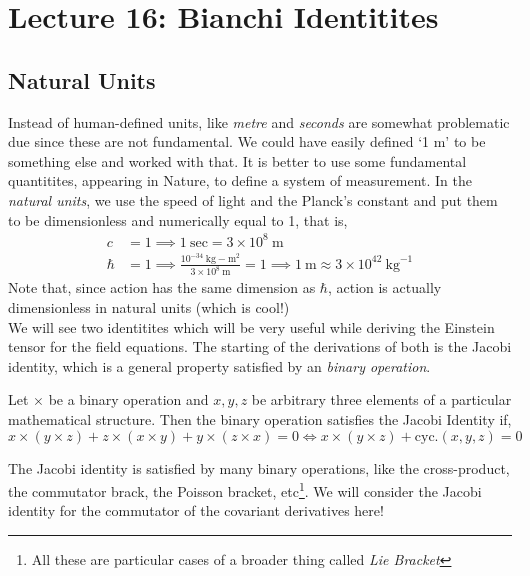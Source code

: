 \section*{Lecture 16: Bianchi Identitites}
\subsection{Natural Units}
Instead of human-defined units, like \textit{metre} and \textit{seconds} are somewhat problematic due since these are not fundamental. We could have easily defined `1 m' to be something else and worked with that. It is better to use some fundamental quantitites, appearing in Nature, to define a system of measurement. In the \textit{natural units}, we use the speed of light and the Planck's constant and put them to be dimensionless and numerically equal to 1, that is,
\begin{align*}
    c &= 1 \implies 1 \ \mathrm{sec} = 3\times 10^8\ \mathrm{m}\\
    \hbar&=1 \implies \frac{10^{-34} \ \mathrm{kg-m}^2 }{3\times 10^8\ \mathrm{ m}} = 1 \implies 1\ \mathrm{ m } \approx 3\times 10^{42} \ \mathrm{ kg}^{-1}
\end{align*}
Note that, since action has the same dimension as $\hbar$, action is actually dimensionless in natural units (which is cool!)\\[0.2cm]
We will see two identitites which will be very useful while deriving the Einstein tensor for the field equations. The starting of the derivations of both is the Jacobi identity, which is a general property satisfied by an \textit{binary operation}. 
\begin{identity}
    Let $\times$ be a binary operation and $x,y,z$ be arbitrary three elements of a particular mathematical structure. Then the binary operation satisfies the Jacobi Identity if,
    $$x\times (y\times z) + z\times (x\times y) + y\times (z\times x) = 0 \iff x\times (y\times z) + \mathrm{cyc}. (x,y,z)=0$$
\end{identity}
The Jacobi identity is satisfied by many binary operations, like the cross-product, the commutator brack, the Poisson bracket, etc\footnote{All these are particular cases of a broader thing called \textit{Lie Bracket}}. We will consider the Jacobi identity for the commutator of the covariant derivatives here!
